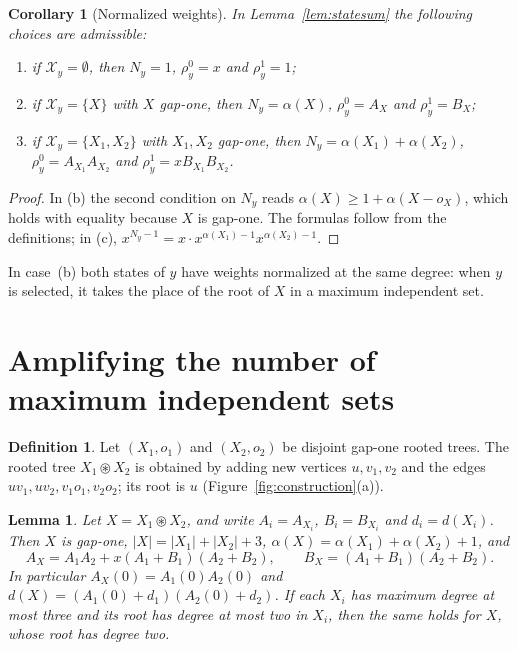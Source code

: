 \documentclass[11pt]{amsart}
\newtheorem{lemma}[theorem]{Lemma}
\newtheorem{corollary}[theorem]{Corollary}
\theoremstyle{definition}
\newtheorem{definition}[theorem]{Definition}
\theoremstyle{remark}
\numberwithin{equation}{section}
\newcommand{\cX}{\mathcal{X}}
\newcommand{\cs}{\circledast}
\begin{document}
\begin{corollary}[Normalized weights]\label{cor:weights}
In Lemma~\ref{lem:statesum} the following choices are admissible:
\begin{enumerate}[label=\textup{(\alph*)}]
\item if $\cX_y=\emptyset$, then $N_y=1$, $\rho_y^0=x$ and $\rho_y^1=1$;
\item if $\cX_y=\{X\}$ with $X$ gap-one, then $N_y=\alpha(X)$, $\rho_y^0=A_X$ and $\rho_y^1=B_X$;
\item if $\cX_y=\{X_1,X_2\}$ with $X_1,X_2$ gap-one, then $N_y=\alpha(X_1)+\alpha(X_2)$, $\rho_y^0=A_{X_1}A_{X_2}$ and $\rho_y^1=xB_{X_1}B_{X_2}$.
\end{enumerate}
\end{corollary}

\begin{proof}
In (b) the second condition on $N_y$ reads $\alpha(X)\ge1+\alpha(X-o_X)$, which holds with equality because $X$ is gap-one. The formulas follow from the definitions; in (c), $x^{N_y-1}=x\cdot x^{\alpha(X_1)-1}x^{\alpha(X_2)-1}$.
\end{proof}

In case~(b) both states of $y$ have weights normalized at the same degree: when $y$ is selected, it takes the place of the root of $X$ in a maximum independent set.

\section{Amplifying the number of maximum independent sets}\label{sec:amplifier}

\begin{definition}\label{def:product}
Let $(X_1,o_1)$ and $(X_2,o_2)$ be disjoint gap-one rooted trees. The rooted tree $X_1\cs X_2$ is obtained by adding new vertices $u,v_1,v_2$ and the edges $uv_1,uv_2,v_1o_1,v_2o_2$; its root is $u$ (Figure~\ref{fig:construction}(a)).
\end{definition}

\begin{lemma}\label{lem:product}
Let $X=X_1\cs X_2$, and write $A_i=A_{X_i}$, $B_i=B_{X_i}$ and $d_i=d(X_i)$. Then $X$ is gap-one, $|X|=|X_1|+|X_2|+3$, $\alpha(X)=\alpha(X_1)+\alpha(X_2)+1$, and
\begin{equation}\label{eq:product}
A_X=A_1A_2+x(A_1+B_1)(A_2+B_2),\qquad B_X=(A_1+B_1)(A_2+B_2).
\end{equation}
In particular $A_X(0)=A_1(0)A_2(0)$ and $d(X)=(A_1(0)+d_1)(A_2(0)+d_2)$. If each $X_i$ has maximum degree at most three and its root has degree at most two in $X_i$, then the same holds for $X$, whose root has degree two.
\end{lemma}
\end{document}
